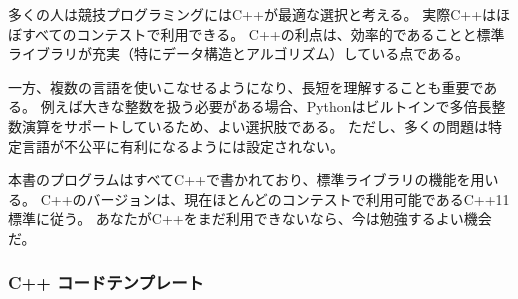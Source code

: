 \begin{comment}
Many people think that C++ is the best choice
for a competitive programmer,
and C++ is nearly always available in
contest systems.
The benefits of using C++ are that
it is a very efficient language and
its standard library contains a 
large collection
of data structures and algorithms.
\end{comment}

多くの人は競技プログラミングにはC++が最適な選択と考える。
実際C++はほぼすべてのコンテストで利用できる。
C++の利点は、効率的であることと標準ライブラリが充実（特にデータ構造とアルゴリズム）している点である。

\begin{comment}
On the other hand, it is good to
master several languages and understand
their strengths.
For example, if large integers are needed
in the problem,
Python can be a good choice, because it
contains built-in operations for
calculating with large integers.
Still, most problems in programming contests
are set so that
using a specific programming language
is not an unfair advantage.
\end{comment}

一方、複数の言語を使いこなせるようになり、長短を理解することも重要である。
例えば大きな整数を扱う必要がある場合、Pythonはビルトインで多倍長整数演算をサポートしているため、よい選択肢である。
ただし、多くの問題は特定言語が不公平に有利になるようには設定されない。


\begin{comment}
All example programs in this book are written in C++,
and the standard library's
data structures and algorithms are often used.
The programs follow the C++11 standard,
which can be used in most contests nowadays.
If you cannot program in C++ yet,
now is a good time to start learning.
\end{comment}

本書のプログラムはすべてC++で書かれており、標準ライブラリの機能を用いる。
C++のバージョンは、現在ほとんどのコンテストで利用可能であるC++11標準に従う。
あなたがC++をまだ利用できないなら、今は勉強するよい機会だ。

\begin{comment}
\subsubsection{C++ code template}
\end{comment}

\subsubsection{C++ コードテンプレート}

